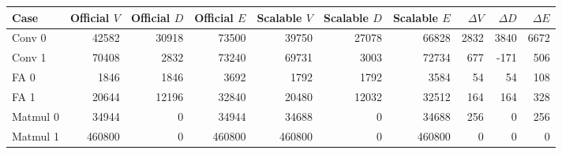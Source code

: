 \begin{tabular}{lrrrrrrrrr}
\toprule
Case & Official $V$ & Official $D$ & Official $E$ & Scalable $V$ & Scalable $D$ & Scalable $E$ & $\Delta V$ & $\Delta D$ & $\Delta E$ \\
\midrule
Conv 0 & 42582 & 30918 & 73500 & 39750 & 27078 & 66828 & 2832 & 3840 & 6672 \\
Conv 1 & 70408 & 2832 & 73240 & 69731 & 3003 & 72734 & 677 & -171 & 506 \\
FA 0 & 1846 & 1846 & 3692 & 1792 & 1792 & 3584 & 54 & 54 & 108 \\
FA 1 & 20644 & 12196 & 32840 & 20480 & 12032 & 32512 & 164 & 164 & 328 \\
Matmul 0 & 34944 & 0 & 34944 & 34688 & 0 & 34688 & 256 & 0 & 256 \\
Matmul 1 & 460800 & 0 & 460800 & 460800 & 0 & 460800 & 0 & 0 & 0 \\
\bottomrule
\end{tabular}
